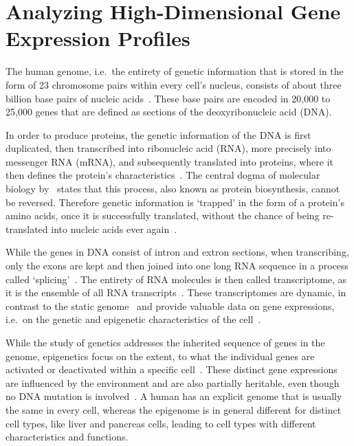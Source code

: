 \section{Analyzing High-Dimensional Gene Expression Profiles}\label{sec:geneticData}

The human genome, i.e.\ the entirety of genetic information that is stored in the form of 23 chromosome
pairs within every cell's nucleus, consists of about three billion base pairs of nucleic acids~\citep{venter}.
These base pairs are encoded in 20,000 to 25,000 genes that are defined as sections of the deoxyribonucleic acid (DNA).

In order to produce proteins, the genetic information of the DNA is first duplicated, then transcribed
into ribonucleic acid (RNA), more precisely into messenger RNA (mRNA), and subsequently translated into proteins, where it then defines
the protein's characteristics~\citep{crick, koonin}.
The central dogma of molecular biology by~\cite{crick} states that this process, also known as protein biosynthesis, cannot be reversed.
Therefore genetic information is `trapped' in the form of a protein's amino acids, once it is successfully
translated, without the chance of being re-translated into nucleic acids ever again~\citep{crick, koonin}.

While the genes in DNA consist of intron and extron sections, when transcribing, only the exons are kept
and then joined into one long RNA sequence in a process called `splicing'~\citep{wang10}.
The entirety of RNA molecules is then called transcriptome, as it is the ensemble of all RNA transcripts~\citep{malone, venter}.
These transcriptomes are dynamic, in contrast to the static genome~\citep{marguerat}
and provide valuable data on gene expressions, i.e.\ on the genetic and epigenetic characteristics of the cell~\citep{wang09, jones}.

While the study of genetics addresses the inherited sequence of genes in the genome, epigenetics
focus on the extent, to what the individual genes are activated or deactivated within a specific cell~\citep{jones,jaenisch}.
These distinct gene expressions are influenced by the environment and are
also partially heritable, even though no DNA mutation is involved~\citep{jaenisch}.
A human has an explicit genome that is usually the same in every cell,
whereas the epigenome is in general different for distinct cell types, like liver and pancreas cells,
leading to cell types with different characteristics and functions.

